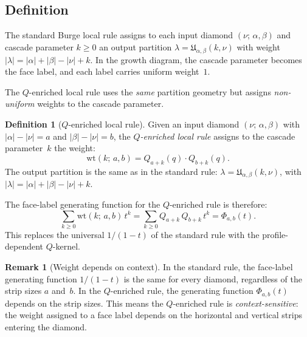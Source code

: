 \documentclass[11pt]{article}
\theoremstyle{plain}
\theoremstyle{definition}
\newtheorem{definition}[theorem]{Definition}
\newtheorem{remark}[theorem]{Remark}
\begin{document}
\subsection{Definition}

The standard Burge local rule assigns to each input diamond
$(\nu;\, \alpha, \beta)$ and cascade parameter $k \geq 0$ an
output partition $\lambda = \mathfrak{U}_{\alpha,\beta}(k,\nu)$
with weight $|\lambda| = |\alpha| + |\beta| - |\nu| + k$.
In the growth diagram, the cascade parameter becomes the face
label, and each label carries uniform weight~$1$.

The $Q$-enriched local rule uses the \emph{same} partition
geometry but assigns \emph{non-uniform} weights to the cascade
parameter.

\begin{definition}[$Q$-enriched local rule]
\label{def:Q-local-rule}
Given an input diamond $(\nu;\, \alpha, \beta)$ with
$|\alpha| - |\nu| = a$ and $|\beta| - |\nu| = b$, the
\emph{$Q$-enriched local rule} assigns to the cascade
parameter~$k$ the weight:
\begin{equation}\label{eq:Q-face-weight}
  \mathrm{wt}(k;\, a, b) = Q_{a+k}(q) \cdot Q_{b+k}(q).
\end{equation}
The output partition is the same as in the standard rule:
$\lambda = \mathfrak{U}_{\alpha,\beta}(k,\nu)$, with
$|\lambda| = |\alpha| + |\beta| - |\nu| + k$.
\end{definition}

The face-label generating function for the $Q$-enriched rule is
therefore:
\begin{equation}\label{eq:face-gf-Q}
  \sum_{k \geq 0} \mathrm{wt}(k;\, a, b)\, t^k
  = \sum_{k \geq 0} Q_{a+k}\, Q_{b+k}\, t^k
  = \Phi_{a,b}(t).
\end{equation}
This replaces the universal $1/(1-t)$ of the standard rule with
the profile-dependent $Q$-kernel.

\begin{remark}[Weight depends on context]
\label{rem:context-weight}
In the standard rule, the face-label generating function $1/(1-t)$
is the same for every diamond, regardless of the strip sizes $a$
and~$b$.  In the $Q$-enriched rule, the generating function
$\Phi_{a,b}(t)$ depends on the strip sizes.  This means the
$Q$-enriched rule is \emph{context-sensitive}: the weight assigned
to a face label depends on the horizontal and vertical strips
entering the diamond.
\end{remark}
\end{document}
